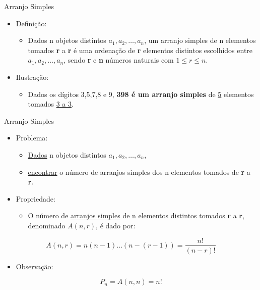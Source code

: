\documentclass[aspectratio=169]{beamer}
\begin{document}
\begin{frame}{Arranjo Simples}
    \begin{itemize}
        \item Definição:
        \begin{itemize}
            \item Dados n objetos distintos $a_1, a_2, \ldots, a_n$, um arranjo simples de n elementos tomados \textbf{r} a \textbf{r} é uma ordenação de \textbf{r} elementos distintos escolhidos entre $a_1, a_2, \ldots, a_n$, sendo \textbf{r} e \textbf{n} números naturais com $1 \leq r \leq n$.
        \end{itemize}
    \end{itemize}

    \vspace{4mm}
    \begin{itemize}
        \item Ilustração:
        \begin{itemize}
            \item Dados os dígitos 3,5,7,8 e 9, \textbf{398 é um arranjo simples} de \underline{5} elementos tomados \underline{3 a 3}.
        \end{itemize}
    \end{itemize}


\end{frame}

\begin{frame}{Arranjo Simples}
    \begin{itemize}
        \item Problema:
        \begin{itemize}
            \item \underline{Dados} n objetos distintos $a_1, a_2, \ldots, a_n$,
            \item \underline{encontrar} o número de arranjos simples dos n elementos tomados de \textbf{r} a \textbf{r}.
        \end{itemize}
    \end{itemize}

    \vspace{4mm}
    \begin{itemize}
        \item Propriedade:
        \begin{itemize}
            \item O número de \underline{arranjos simples} de n elementos distintos tomados \textbf{r} a \textbf{r}, denominado $A(n, r)$, é dado por:
        \end{itemize}
    \end{itemize}

    $$ A(n,r) = n(n-1)\ldots(n-(r-1)) = \frac{n!}{(n-r)!}$$

    \vspace{4mm}
    \begin{itemize}
        \item Observação:
    \end{itemize}

    $$ P_n = A(n,n) = n! $$

\end{frame}
\end{document}

